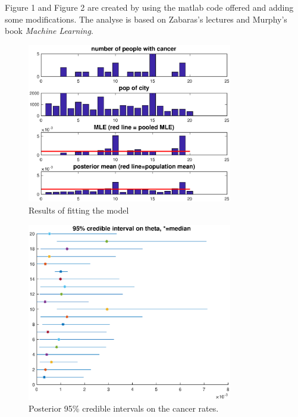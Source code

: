 \documentclass{article}
\newcommand{\widefigurewidth}{0.8\textwidth}
\begin{document}
Figure 1 and Figure 2 are created by using the matlab code offered and adding some modifications. The analyse is based on Zabaras's lectures and Murphy's book \textit{Machine Learning}.

\begin{figure}[h!]
\centering
\includegraphics[width=\widefigurewidth]{fig/HW1P4a.eps}
\caption{Results of fitting the model}
\end{figure}

\begin{figure}[h!]
\centering
\includegraphics[width=\widefigurewidth]{fig/HW1P4b.eps}
\caption{Posterior 95\% credible intervals on the cancer rates.}
\end{figure}
\end{document}
